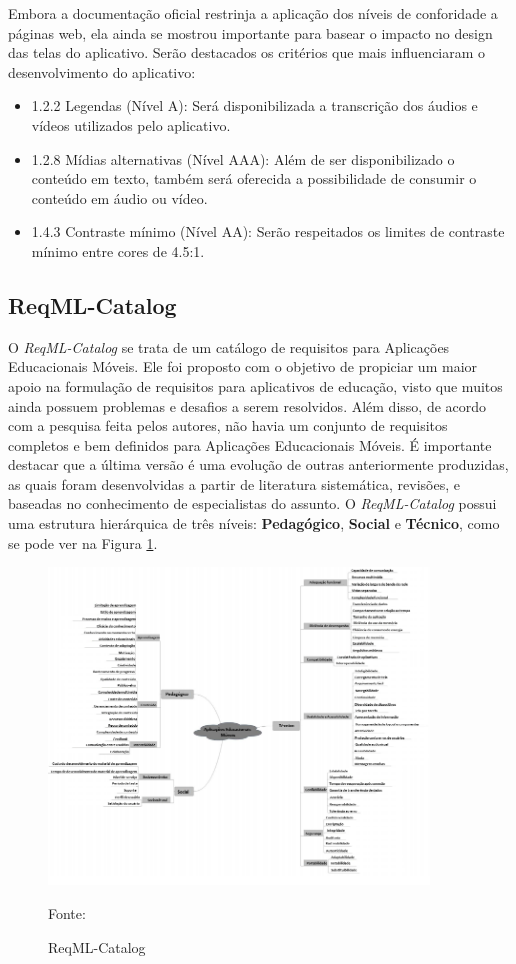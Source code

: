 Embora a documentação oficial restrinja a aplicação dos níveis de conforidade a páginas web, ela ainda se mostrou importante para basear o impacto no design das telas do aplicativo. 
Serão destacados os critérios que mais influenciaram o desenvolvimento do aplicativo:

\begin{itemize}
    \item 1.2.2 Legendas (Nível A): Será disponibilizada a transcrição dos áudios e vídeos utilizados pelo aplicativo.
    \item 1.2.8 Mídias alternativas (Nível AAA): Além de ser disponibilizado o conteúdo em texto, também será oferecida a possibilidade de consumir o conteúdo em áudio ou vídeo.
    \item 1.4.3 Contraste mínimo (Nível AA): Serão respeitados os limites de contraste mínimo entre cores de 4.5:1.
\end{itemize}


\subsection{ReqML-Catalog}
O \textit{ReqML-Catalog} \citep{soad2017reqml} se trata de um catálogo de requisitos para Aplicações Educacionais Móveis. Ele foi proposto com o objetivo de propiciar um maior apoio na formulação de requisitos para aplicativos de educação, visto que muitos ainda possuem problemas e desafios a serem resolvidos. Além disso, de acordo com a pesquisa feita pelos autores, não havia um conjunto de requisitos completos e bem definidos para Aplicações Educacionais Móveis. É importante destacar que a última versão é uma evolução de outras anteriormente produzidas, as quais foram desenvolvidas a partir de literatura sistemática, revisões, e baseadas no conhecimento de especialistas do assunto. 
O \textit{ReqML-Catalog} possui uma estrutura hierárquica de três níveis: \textbf{Pedagógico}, \textbf{Social} e \textbf{Técnico}, como se pode ver na Figura \ref{fig:reqML}.

\begin{figure}[H]
\centering
    \caption{ReqML-Catalog}
    \label{fig:reqML}
    \includegraphics[width=0.9\textwidth]{Figuras/reqML-catalog.png}
    
    Fonte: \cite{soad2017reqml}
\end{figure}

